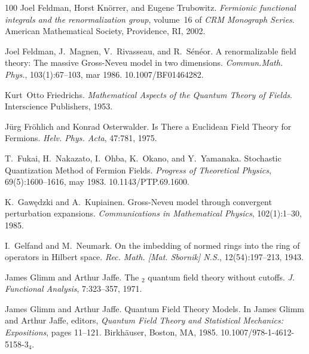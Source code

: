 \documentclass{article}
\newcommand{\tmrsub}[1]{\ensuremath{_{\textrm{#1}}}}
\newcommand{\tmtextit}[1]{{\itshape{#1}}}
\begin{document}
\begin{thebibliography}{100}
  Joel Feldman, Horst Kn{\"o}rrer, and  Eugene
  Trubowitz. {\newblock}\tmtextit{Fermionic functional integrals and the
  renormalization group},  volume~16  of \tmtextit{CRM Monograph Series}.
  {\newblock}American Mathematical Society, Providence, RI, 2002.{\newblock}
  
  Joel Feldman, J.~Magnen,
  V.~Rivasseau, and  R.~S{\'e}n{\'e}or. {\newblock}A renormalizable field
  theory: The massive Gross-Neveu model in two dimensions.
  {\newblock}\tmtextit{Commun.Math. Phys.}, 103(1):67--103, mar 1986.
  {\newblock}\href{Https://doi.org/10.1007/BF01464282}{}10.1007/BF01464282.{\newblock}
  
  Kurt~Otto Friedrichs.
  {\newblock}\tmtextit{Mathematical Aspects of the Quantum Theory of Fields}.
  {\newblock}Interscience Publishers, 1953.{\newblock}
  
  J{\"u}rg Fr{\"o}hlich  and  Konrad
  Osterwalder. {\newblock}Is There a Euclidean Field Theory for Fermions.
  {\newblock}\tmtextit{Helv. Phys. Acta}, 47:781, 1975.{\newblock}
  
  T.~Fukai, H.~Nakazato, I.~Ohba, K.~Okano,
  and  Y.~Yamanaka. {\newblock}Stochastic Quantization Method of Fermion
  Fields. {\newblock}\tmtextit{Progress of Theoretical Physics},
  69(5):1600--1616, may 1983.
  {\newblock}\href{Https://doi.org/10.1143/PTP.69.1600}{}10.1143/PTP.69.1600.{\newblock}
  
  K.~Gaw{\k e}dzki  and  A.~Kupiainen.
  {\newblock}Gross-Neveu model through convergent perturbation expansions.
  {\newblock}\tmtextit{Communications in Mathematical Physics}, 102(1):1--30,
  1985.{\newblock}
  
  I.~Gelfand  and  M.~Neumark. {\newblock}On the
  imbedding of normed rings into the ring of operators in Hilbert space.
  {\newblock}\tmtextit{Rec. Math. [Mat. Sbornik] N.S.}, 12(54):197--213,
  1943.{\newblock}
  
  James Glimm  and  Arthur Jaffe. {\newblock}The
  \tmrsub{$2$} quantum field theory without cutoffs.
  {\newblock}\tmtextit{J. Functional Analysis}, 7:323--357, 1971.{\newblock}
  
  James Glimm  and  Arthur Jaffe.
  {\newblock}Quantum Field Theory Models. {\newblock}In  James Glimm  and 
  Arthur Jaffe, editors, \tmtextit{Quantum Field Theory and Statistical
  Mechanics: Expositions},  pages  11--121. Birkh{\"a}user, Boston, MA, 1985.
  {\newblock}\href{Https://doi.org/10.1007/978-1-4612-5158-3_4}{}10.1007/978-1-4612-5158-3\tmrsub{4}.{\newblock}
  

\end{thebibliography}
\end{document}
